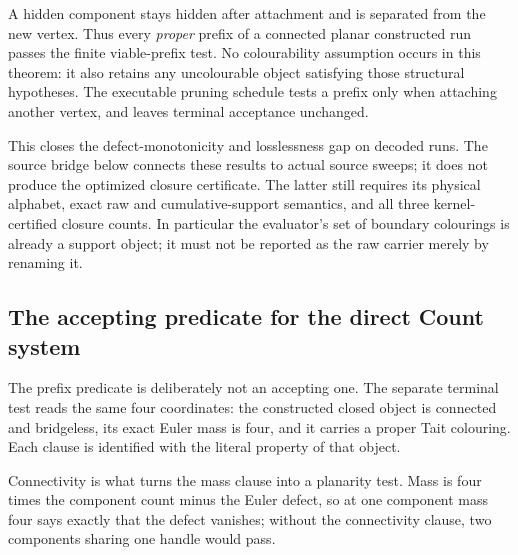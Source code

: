A hidden component stays hidden after attachment and is separated from the
new vertex. Thus every \emph{proper} prefix of a connected planar constructed
run passes the finite viable-prefix test. No colourability assumption occurs
in this theorem: it also retains any uncolourable object satisfying those
structural hypotheses. The executable pruning schedule tests a prefix only
when attaching another vertex, and leaves terminal acceptance unchanged.

This closes the defect-monotonicity and losslessness gap on decoded runs.
The source bridge below connects these results to actual source sweeps;
it does not produce the optimized closure certificate. The latter still
requires its physical alphabet, exact raw and cumulative-support semantics,
and all three kernel-certified closure counts. In particular the evaluator's
set of boundary colourings is already a support object; it must not be
reported as the raw carrier merely by renaming it.

\subsection{The accepting predicate for the direct Count system}
\label{sec:direct-count-acceptance}

The prefix predicate is deliberately not an accepting one. The separate
terminal test reads the same four coordinates: the constructed closed object
is connected and bridgeless, its exact Euler mass is four, and it carries a
proper Tait colouring. Each clause is identified with the literal property of
that object.

Connectivity is what turns the mass clause into a planarity test. Mass is
four times the component count minus the Euler defect, so at one component
mass four says exactly that the defect vanishes; without the connectivity
clause, two components sharing one handle would pass.

